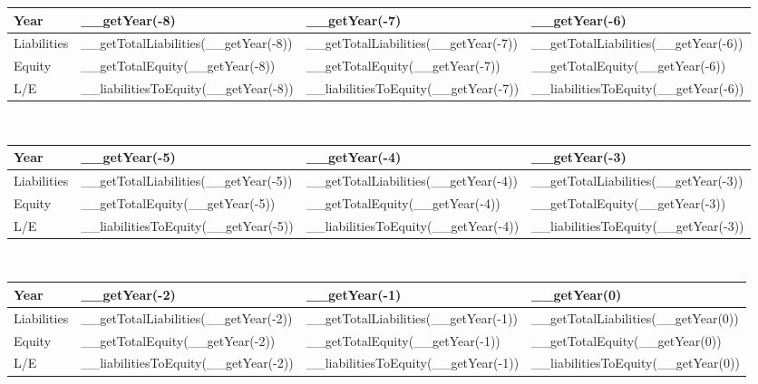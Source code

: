 \begin{tabularx}{\textwidth}{|X|X|X|X|}
 \hline
 Year                     & __getYear(-8)                        & __getYear(-7)                        & __getYear(-6)                        \\
 \hline
 Liabilities              & __getTotalLiabilities(__getYear(-8)) & __getTotalLiabilities(__getYear(-7)) & __getTotalLiabilities(__getYear(-6)) \\
 Equity                   & __getTotalEquity(__getYear(-8))      & __getTotalEquity(__getYear(-7))      & __getTotalEquity(__getYear(-6))      \\
 \rowcolor{lightgray} L/E & __liabilitiesToEquity(__getYear(-8)) & __liabilitiesToEquity(__getYear(-7)) & __liabilitiesToEquity(__getYear(-6)) \\
 \hline
\end{tabularx}\\

\begin{tabularx}{\textwidth}{|X|X|X|X|}
 \hline
 Year                     & __getYear(-5)                        & __getYear(-4)                        & __getYear(-3)                        \\
 \hline
 Liabilities              & __getTotalLiabilities(__getYear(-5)) & __getTotalLiabilities(__getYear(-4)) & __getTotalLiabilities(__getYear(-3)) \\
 Equity                   & __getTotalEquity(__getYear(-5))      & __getTotalEquity(__getYear(-4))      & __getTotalEquity(__getYear(-3))      \\
 \rowcolor{lightgray} L/E & __liabilitiesToEquity(__getYear(-5)) & __liabilitiesToEquity(__getYear(-4)) & __liabilitiesToEquity(__getYear(-3)) \\
 \hline
\end{tabularx}\\

\begin{tabularx}{\textwidth}{|X|X|X|X|}
 \hline
 Year                     & __getYear(-2)                        & __getYear(-1)                        & __getYear(0)                        \\
 \hline
 Liabilities              & __getTotalLiabilities(__getYear(-2)) & __getTotalLiabilities(__getYear(-1)) & __getTotalLiabilities(__getYear(0)) \\
 Equity                   & __getTotalEquity(__getYear(-2))      & __getTotalEquity(__getYear(-1))      & __getTotalEquity(__getYear(0))      \\
 \rowcolor{lightgray} L/E & __liabilitiesToEquity(__getYear(-2)) & __liabilitiesToEquity(__getYear(-1)) & __liabilitiesToEquity(__getYear(0)) \\
 \hline
\end{tabularx}

